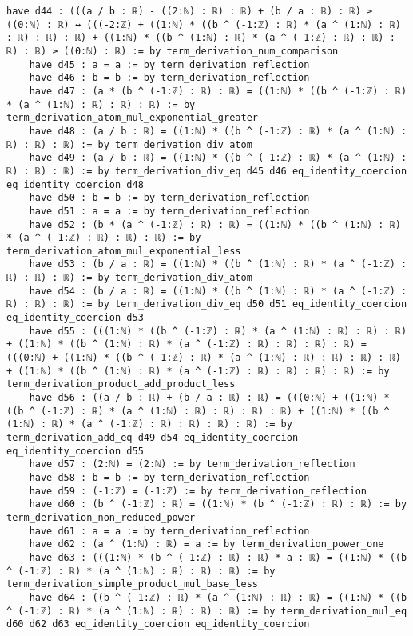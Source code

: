 \documentclass{article}
\begin{document}
\begin{tcolorbox}[colback=white!10, width=\linewidth]
\begin{lstlisting}[language=Lean4]
    have d44 : (((a / b : ℝ) - ((2:ℕ) : ℝ) : ℝ) + (b / a : ℝ) : ℝ) ≥ ((0:ℕ) : ℝ) ↔ (((-2:ℤ) + ((1:ℕ) * ((b ^ (-1:ℤ) : ℝ) * (a ^ (1:ℕ) : ℝ) : ℝ) : ℝ) : ℝ) + ((1:ℕ) * ((b ^ (1:ℕ) : ℝ) * (a ^ (-1:ℤ) : ℝ) : ℝ) : ℝ) : ℝ) ≥ ((0:ℕ) : ℝ) := by term_derivation_num_comparison
    have d45 : a = a := by term_derivation_reflection
    have d46 : b = b := by term_derivation_reflection
    have d47 : (a * (b ^ (-1:ℤ) : ℝ) : ℝ) = ((1:ℕ) * ((b ^ (-1:ℤ) : ℝ) * (a ^ (1:ℕ) : ℝ) : ℝ) : ℝ) := by term_derivation_atom_mul_exponential_greater
    have d48 : (a / b : ℝ) = ((1:ℕ) * ((b ^ (-1:ℤ) : ℝ) * (a ^ (1:ℕ) : ℝ) : ℝ) : ℝ) := by term_derivation_div_atom
    have d49 : (a / b : ℝ) = ((1:ℕ) * ((b ^ (-1:ℤ) : ℝ) * (a ^ (1:ℕ) : ℝ) : ℝ) : ℝ) := by term_derivation_div_eq d45 d46 eq_identity_coercion eq_identity_coercion d48
    have d50 : b = b := by term_derivation_reflection
    have d51 : a = a := by term_derivation_reflection
    have d52 : (b * (a ^ (-1:ℤ) : ℝ) : ℝ) = ((1:ℕ) * ((b ^ (1:ℕ) : ℝ) * (a ^ (-1:ℤ) : ℝ) : ℝ) : ℝ) := by term_derivation_atom_mul_exponential_less
    have d53 : (b / a : ℝ) = ((1:ℕ) * ((b ^ (1:ℕ) : ℝ) * (a ^ (-1:ℤ) : ℝ) : ℝ) : ℝ) := by term_derivation_div_atom
    have d54 : (b / a : ℝ) = ((1:ℕ) * ((b ^ (1:ℕ) : ℝ) * (a ^ (-1:ℤ) : ℝ) : ℝ) : ℝ) := by term_derivation_div_eq d50 d51 eq_identity_coercion eq_identity_coercion d53
    have d55 : (((1:ℕ) * ((b ^ (-1:ℤ) : ℝ) * (a ^ (1:ℕ) : ℝ) : ℝ) : ℝ) + ((1:ℕ) * ((b ^ (1:ℕ) : ℝ) * (a ^ (-1:ℤ) : ℝ) : ℝ) : ℝ) : ℝ) = (((0:ℕ) + ((1:ℕ) * ((b ^ (-1:ℤ) : ℝ) * (a ^ (1:ℕ) : ℝ) : ℝ) : ℝ) : ℝ) + ((1:ℕ) * ((b ^ (1:ℕ) : ℝ) * (a ^ (-1:ℤ) : ℝ) : ℝ) : ℝ) : ℝ) := by term_derivation_product_add_product_less
    have d56 : ((a / b : ℝ) + (b / a : ℝ) : ℝ) = (((0:ℕ) + ((1:ℕ) * ((b ^ (-1:ℤ) : ℝ) * (a ^ (1:ℕ) : ℝ) : ℝ) : ℝ) : ℝ) + ((1:ℕ) * ((b ^ (1:ℕ) : ℝ) * (a ^ (-1:ℤ) : ℝ) : ℝ) : ℝ) : ℝ) := by term_derivation_add_eq d49 d54 eq_identity_coercion eq_identity_coercion d55
    have d57 : (2:ℕ) = (2:ℕ) := by term_derivation_reflection
    have d58 : b = b := by term_derivation_reflection
    have d59 : (-1:ℤ) = (-1:ℤ) := by term_derivation_reflection
    have d60 : (b ^ (-1:ℤ) : ℝ) = ((1:ℕ) * (b ^ (-1:ℤ) : ℝ) : ℝ) := by term_derivation_non_reduced_power
    have d61 : a = a := by term_derivation_reflection
    have d62 : (a ^ (1:ℕ) : ℝ) = a := by term_derivation_power_one
    have d63 : (((1:ℕ) * (b ^ (-1:ℤ) : ℝ) : ℝ) * a : ℝ) = ((1:ℕ) * ((b ^ (-1:ℤ) : ℝ) * (a ^ (1:ℕ) : ℝ) : ℝ) : ℝ) := by term_derivation_simple_product_mul_base_less
    have d64 : ((b ^ (-1:ℤ) : ℝ) * (a ^ (1:ℕ) : ℝ) : ℝ) = ((1:ℕ) * ((b ^ (-1:ℤ) : ℝ) * (a ^ (1:ℕ) : ℝ) : ℝ) : ℝ) := by term_derivation_mul_eq d60 d62 d63 eq_identity_coercion eq_identity_coercion

\end{lstlisting}
\end{tcolorbox}
\end{document}
